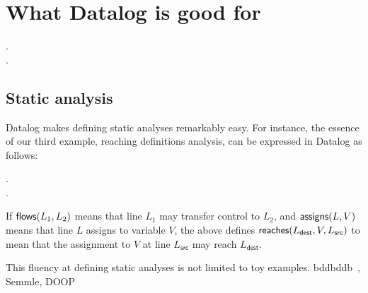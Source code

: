 
\section{What Datalog is good for}


\begin{datalog}
  .\\
   \gets {} \conj {}.
\end{datalog}

\subsection{Static analysis}

Datalog makes defining static analyses remarkably easy. For instance, the
essence of our third example, reaching definitions analysis, can be expressed in
Datalog as follows:

\begin{datalog}
   \gets {}.
  \\
  \gets
  \neg{}
  \conj
  \conj 
  .
\end{datalog}

\noindent
If $\text{\sffamily flows}({L_1, L_2})$ means that line $L_1$ may transfer control to $L_2$,
and $\text{\sffamily assigns}({L, V})$ means that line $L$ assigns to variable $V$, the
above defines $\text{\sffamily reaches}({L_{\textsf{dest}}, V, L_{\textsf{src}}})$ to mean
that the assignment to $V$ at line $L_{\textsf{src}}$ may reach
$L_{\textsf{dest}}$.

This fluency at defining static analyses is not limited to toy examples.
 bddbddb~\citep{whaley-lam,DBLP:conf/aplas/WhaleyACL05}, Semmle,
DOOP~\citep{DBLP:conf/datalog/SmaragdakisB10}

